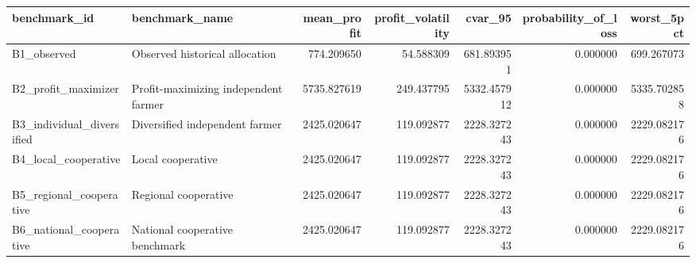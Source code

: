\begin{tabular}{llrrrrr}
\toprule
benchmark\_id & benchmark\_name & mean\_profit & profit\_volatility & cvar\_95 & probability\_of\_loss & worst\_5pct \\
\midrule
B1\_observed & Observed historical allocation & 774.209650 & 54.588309 & 681.893951 & 0.000000 & 699.267073 \\
B2\_profit\_maximizer & Profit-maximizing independent farmer & 5735.827619 & 249.437795 & 5332.457912 & 0.000000 & 5335.702858 \\
B3\_individual\_diversified & Diversified independent farmer & 2425.020647 & 119.092877 & 2228.327243 & 0.000000 & 2229.082176 \\
B4\_local\_cooperative & Local cooperative & 2425.020647 & 119.092877 & 2228.327243 & 0.000000 & 2229.082176 \\
B5\_regional\_cooperative & Regional cooperative & 2425.020647 & 119.092877 & 2228.327243 & 0.000000 & 2229.082176 \\
B6\_national\_cooperative & National cooperative benchmark & 2425.020647 & 119.092877 & 2228.327243 & 0.000000 & 2229.082176 \\
\bottomrule
\end{tabular}
